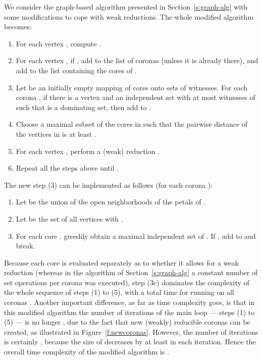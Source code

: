 \documentclass[preprint,12pt]{elsarticle}
\begin{document}
We consider the graph-based algorithm presented in Section~\ref{s:graph-alg} with some modifications to cope with weak reductions. The whole modified algorithm becomes:

\begin{enumerate}[(1)]
\item For each vertex , compute .

\item For each vertex , if , add  to the list of coronas  (unless it is already there), and add  to the list  containing the cores of .

\item Let  be an initially empty mapping of cores onto sets of witnesses. For each corona , if there is a vertex  and an independent set  with at most  witnesses of  such that  is a dominating set, then add  to . 

\item Choose a maximal subset  of the cores in  such that the pairwise distance of the vertices in  is at least .

\item For each vertex , perform a (weak) reduction .

\item Repeat all the steps above until .
\end{enumerate}


The new step (3) can be implemented as follows (for each corona ):

\begin{enumerate}[(3a)]
\item Let  be the union of the open neighborhoods of the  petals of .

\item Let  be the set of all vertices  with .

\item For each core , greedily obtain a maximal independent set  of . If , add  to  and break.
\end{enumerate}

Because each core is evaluated separately as to whether it allows for a weak reduction (whereas in the algorithm of Section~\ref{s:graph-alg} a constant number of set operations per corona was executed), step (3c) dominates the complexity of the whole sequence of steps (1) to (5), with a total  time for running on all coronas . Another important difference, as far as time complexity goes, is that in this modified algorithm the number of iterations of the main loop --- steps (1) to (5) --- is no longer , due to the fact that new (weakly) reducible coronas can be created, as illustrated in Figure~\ref{f:newcoronas}. However, the number of iterations is certainly , because the size \linebreak of  decreases by at least  in each iteration. Hence the overall time complexity of the modified algorithm is .
\end{document}
